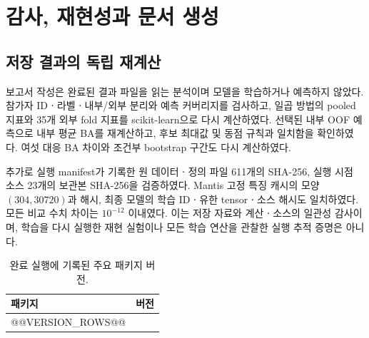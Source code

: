 \documentclass[11pt,a4paper]{article}
\numberwithin{equation}{section}
\begin{document}
\section{감사, 재현성과 문서 생성}
\subsection{저장 결과의 독립 재계산}
보고서 작성은 완료된 결과 파일을 읽는 분석이며 모델을 학습하거나 예측하지 않았다.
참가자 IDㆍ라벨ㆍ내부/외부 분리와 예측 커버리지를 검사하고,
일곱 방법의 pooled 지표와 35개 외부 fold 지표를 scikit-learn으로 다시 계산하였다.
선택된 내부 OOF 예측으로 내부 평균 BA를 재계산하고, 후보 최대값 및 동점 규칙과
일치함을 확인하였다. 여섯 대응 BA 차이와 조건부 bootstrap 구간도 다시 계산하였다.

추가로 실행 manifest가 기록한 원 데이터ㆍ정의 파일 611개의 SHA-256,
실행 시점 소스 23개의 보관본 SHA-256을 검증하였다.
Mantis 고정 특징 캐시의 모양 $(304,30720)$과 해시,
최종 모델의 학습 IDㆍ유한 tensorㆍ소스 해시도 일치하였다.
모든 비교 수치 차이는 $10^{-12}$ 이내였다.
이는 저장 자료와 계산ㆍ소스의 일관성 감사이며, 학습을 다시 실행한 재현 실험이나
모든 학습 연산을 관찰한 실행 추적 증명은 아니다.

\begin{table}[H]\centering\small
\caption{완료 실행에 기록된 주요 패키지 버전.}
\begin{tabular}{@{}lr@{}}\toprule 패키지 & 버전\\\midrule
@@VERSION_ROWS@@
\bottomrule\end{tabular}
\end{table}
\end{document}
